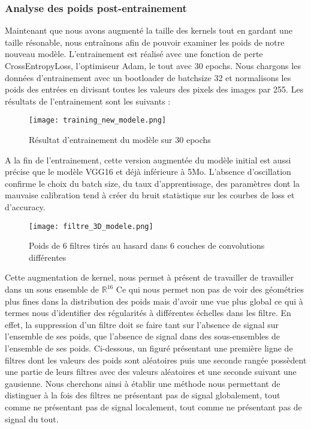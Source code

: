 \documentclass[12pt,a4paper]{article}
\begin{document}
\subsubsection{Analyse des poids post-entrainement}

Maintenant que nous avons augmenté la taille des kernels tout en gardant une taille résonable,  nous entraînons afin de pouvoir examiner les poids de notre nouveau modèle.
L'entrainement est réalisé avec une fonction de perte CrossEntropyLoss, l'optimiseur Adam, le tout avec 30 epochs. Nous chargons les données d'entrainement avec un bootloader de batchsize 32 et normalisons les poids des entrées en divisant toutes les valeurs des pixels des images par 255. 
Les résultats de l'entrainement sont les suivants : 
\begin{figure}[H] %
    \centering    %
    \texttt{[image: training\_new\_modele.png]} %
    \caption{Résultat d'entrainement du modèle sur 30 epochs } %
    \label{fig:mon_image} %
\end{figure}
A la fin de l'entrainement, cette version augmentée du modèle initial est aussi précise que le modèle VGG16 et déjà inférieure à 5Mo. L'absence d'oscillation confirme le choix du batch size, du taux d'apprentissage, des paramètres dont la mauvaise calibration tend à créer du bruit statistique sur les courbes de loss et d'accuracy. 
\begin{figure}[H] %
    \centering    %
    \texttt{[image: filtre\_3D\_modele.png]} %
    \caption{Poids de 6 filtres tirés au hasard dans 6 couches de convolutions différentes} %
    \label{fig:mon_image} %
\end{figure}
Cette augmentation de kernel, nous permet à présent de travailler de travailler dans un sous ensemble de $\mathbb{R}^{16}$ Ce qui nous permet non pas de voir des géométries plus fines dans la distribution des poids mais d'avoir une vue plus global ce qui à termes nous d'identifier des régularités à différentes échelles dans les filtre. En effet, la suppression d'un filtre doit se faire tant sur l'absence de signal sur l'ensemble de ses poids, que l'absence de signal dans des sous-ensembles de l'ensemble de ses poids. 
Ci-dessous, un figuré présentant une première ligne de filtres dont les valeurs des poids sont aléatoires puis une seconde rangée possèdent une partie de leurs filtres avec des valeurs aléatoires et une seconde suivant une gausienne. Nous cherchons ainsi à établir une méthode nous permettant de distinguer à la fois des filtres ne présentant pas de signal globalement, tout comme ne présentant pas de signal localement, tout comme ne présentant pas de signal du tout. 
\end{document}

